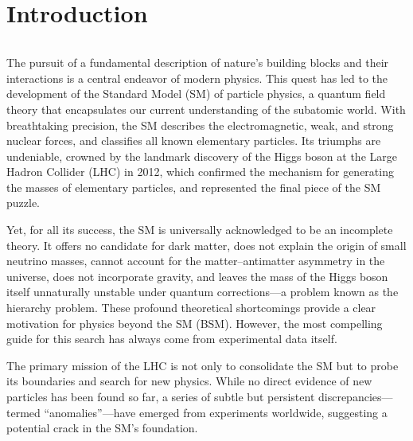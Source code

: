 \chapter*{Introduction}
$ $ 

The pursuit of a fundamental description of nature's building blocks and their interactions is a central endeavor of modern physics. This quest has led to the development of the Standard Model (SM) of particle physics, a quantum field theory that encapsulates our current understanding of the subatomic world. With breathtaking precision, the SM describes the electromagnetic, weak, and strong nuclear forces, and classifies all known elementary particles. Its triumphs are undeniable, crowned by the landmark discovery of the Higgs boson at the Large Hadron Collider (LHC) in 2012, which confirmed the mechanism for generating the masses of elementary particles, and represented the final piece of the SM puzzle.

Yet, for all its success, the SM is universally acknowledged to be an incomplete theory. It offers no candidate for dark matter, does not explain the origin of small neutrino masses, cannot account for the matter–antimatter asymmetry in the universe, does not incorporate gravity, and leaves the mass of the Higgs boson itself unnaturally unstable under quantum corrections—a problem known as the hierarchy problem. These profound theoretical shortcomings provide a clear motivation for physics beyond the SM (BSM). However, the most compelling guide for this search has always come from experimental data itself.

The primary mission of the LHC is not only to consolidate the SM but to probe its boundaries and search for new physics. While no direct evidence of new particles has been found so far, a series of subtle but persistent discrepancies—termed ``anomalies''—have emerged from experiments worldwide, suggesting a potential crack in the SM's foundation.

